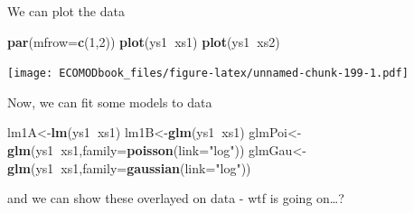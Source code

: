 \documentclass[
]{book}
\newenvironment{Shaded}{\begin{snugshade}}{\end{snugshade}}
\newcommand{\DataTypeTok}[1]{\textcolor[rgb]{0.13,0.29,0.53}{#1}}
\newcommand{\DecValTok}[1]{\textcolor[rgb]{0.00,0.00,0.81}{#1}}
\newcommand{\KeywordTok}[1]{\textcolor[rgb]{0.13,0.29,0.53}{\textbf{#1}}}
\newcommand{\NormalTok}[1]{#1}
\newcommand{\OperatorTok}[1]{\textcolor[rgb]{0.81,0.36,0.00}{\textbf{#1}}}
\newcommand{\StringTok}[1]{\textcolor[rgb]{0.31,0.60,0.02}{#1}}
\begin{document}
We can plot the data

\begin{Shaded}
\begin{Highlighting}[]
\KeywordTok{par}\NormalTok{(}\DataTypeTok{mfrow=}\KeywordTok{c}\NormalTok{(}\DecValTok{1}\NormalTok{,}\DecValTok{2}\NormalTok{))}
\KeywordTok{plot}\NormalTok{(ys1}\OperatorTok{~}\NormalTok{xs1)}
\KeywordTok{plot}\NormalTok{(ys1}\OperatorTok{~}\NormalTok{xs2)}
\end{Highlighting}
\end{Shaded}

\texttt{[image: ECOMODbook\_files/figure-latex/unnamed-chunk-199-1.pdf]}

Now, we can fit some models to data

\begin{Shaded}
\begin{Highlighting}[]
\NormalTok{lm1A<-}\KeywordTok{lm}\NormalTok{(ys1}\OperatorTok{~}\NormalTok{xs1)}
\NormalTok{lm1B<-}\KeywordTok{glm}\NormalTok{(ys1}\OperatorTok{~}\NormalTok{xs1)}
\NormalTok{glmPoi<-}\KeywordTok{glm}\NormalTok{(ys1}\OperatorTok{~}\NormalTok{xs1,}\DataTypeTok{family=}\KeywordTok{poisson}\NormalTok{(}\DataTypeTok{link=}\StringTok{"log"}\NormalTok{))}
\NormalTok{glmGau<-}\KeywordTok{glm}\NormalTok{(ys1}\OperatorTok{~}\NormalTok{xs1,}\DataTypeTok{family=}\KeywordTok{gaussian}\NormalTok{(}\DataTypeTok{link=}\StringTok{"log"}\NormalTok{))}
\end{Highlighting}
\end{Shaded}

and we can show these overlayed on data - wtf is going on\ldots?
\end{document}
